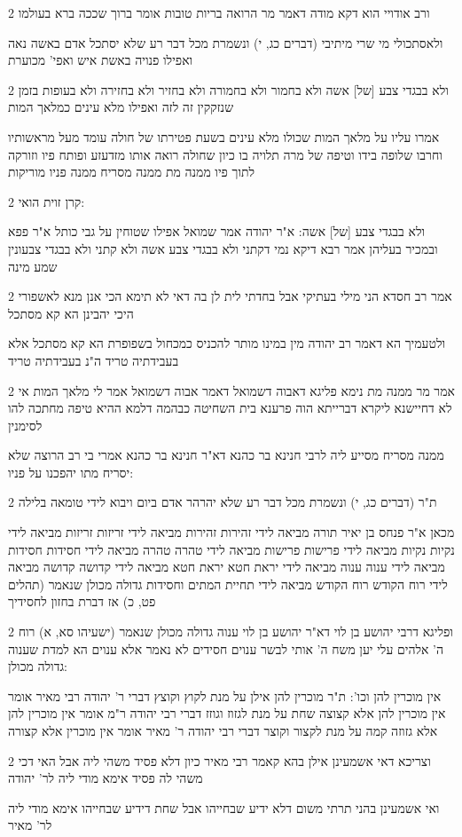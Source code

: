 \documentclass[12pt, openany]{book}
\newcommand{\sethebfont}{
\fontsize{10.5pt}{21.0pt} \selectfont
}
\newcommand{\twocol}[1]{
	{\sethebfont \begin{multicols}{2}
			#1
	\end{multicols}}	
}
\begin{document}
\twocol{ורב אודויי הוא דקא מודה דאמר מר הרואה בריות טובות אומר ברוך שככה ברא בעולמו
\par ולאסתכולי מי שרי מיתיבי (דברים כג, י) ונשמרת מכל דבר רע שלא יסתכל אדם באשה נאה ואפילו פנויה באשת איש ואפי' מכוערת}
\twocol{ולא בבגדי צבע [של] אשה ולא בחמור ולא בחמורה ולא בחזיר ולא בחזירה ולא בעופות בזמן שנזקקין זה לזה ואפילו מלא עינים כמלאך המות
\par אמרו עליו על מלאך המות שכולו מלא עינים בשעת פטירתו של חולה עומד מעל מראשותיו וחרבו שלופה בידו וטיפה של מרה תלויה בו כיון שחולה רואה אותו מזדעזע ופותח פיו וזורקה לתוך פיו ממנה מת ממנה מסריח ממנה פניו מוריקות}
\twocol{קרן זוית הואי:
\par ולא בבגדי צבע [של] אשה: א"ר יהודה אמר שמואל אפילו שטוחין על גבי כותל א"ר פפא ובמכיר בעליהן אמר רבא דיקא נמי דקתני ולא בבגדי צבע אשה ולא קתני ולא בבגדי צבעונין שמע מינה}
\twocol{אמר רב חסדא הני מילי בעתיקי אבל בחדתי לית לן בה דאי לא תימא הכי אנן מנא לאשפורי היכי יהבינן הא קא מסתכל
\par ולטעמיך הא דאמר רב יהודה מין במינו מותר להכניס כמכחול בשפופרת הא קא מסתכל אלא בעבידתיה טריד ה"נ בעבידתיה טריד}
\twocol{אמר מר ממנה מת נימא פליגא דאבוה דשמואל דאמר אבוה דשמואל אמר לי מלאך המות אי לא דחיישנא ליקרא דברייתא הוה פרענא בית השחיטה כבהמה דלמא ההיא טיפה מחתכה להו לסימנין
\par ממנה מסריח מסייע ליה לרבי חנינא בר כהנא דא"ר חנינא בר כהנא אמרי בי רב הרוצה שלא יסריח מתו יהפכנו על פניו:}
\twocol{ת"ר (דברים כג, י) ונשמרת מכל דבר רע שלא יהרהר אדם ביום ויבוא לידי טומאה בלילה
\par מכאן א"ר פנחס בן יאיר תורה מביאה לידי זהירות זהירות מביאה לידי זריזות זריזות מביאה לידי נקיות נקיות מביאה לידי פרישות פרישות מביאה לידי טהרה טהרה מביאה לידי חסידות חסידות מביאה לידי ענוה ענוה מביאה לידי יראת חטא יראת חטא מביאה לידי קדושה קדושה מביאה לידי רוח הקודש רוח הקודש מביאה לידי תחיית המתים וחסידות גדולה מכולן שנאמר (תהלים פט, כ) אז דברת בחזון לחסידיך}
\twocol{ופליגא דרבי יהושע בן לוי דא"ר יהושע בן לוי ענוה גדולה מכולן שנאמר (ישעיהו סא, א) רוח ה' אלהים עלי יען משח ה' אותי לבשר ענוים חסידים לא נאמר אלא ענוים הא למדת שענוה גדולה מכולן:
\par אין מוכרין להן וכו': ת"ר מוכרין להן אילן על מנת לקוץ וקוצץ דברי ר' יהודה רבי מאיר אומר אין מוכרין להן אלא קצוצה שחת על מנת לגזוז וגוזז דברי רבי יהודה ר"מ אומר אין מוכרין להן אלא גזוזה קמה על מנת לקצור וקוצר דברי רבי יהודה ר' מאיר אומר אין מוכרין אלא קצורה}
\twocol{וצריכא דאי אשמעינן אילן בהא קאמר רבי מאיר כיון דלא פסיד משהי ליה אבל האי דכי משהי לה פסיד אימא מודי ליה לר' יהודה
\par ואי אשמעינן בהני תרתי משום דלא ידיע שבחייהו אבל שחת דידיע שבחייהו אימא מודי ליה לר' מאיר}
\end{document}

